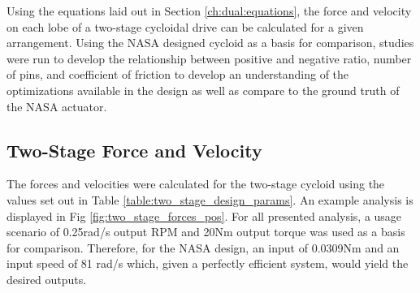 Using the equations laid out in Section \ref{ch:dual:equations}, the force and velocity on each lobe of a two-stage cycloidal drive can be calculated for a given arrangement. Using the NASA designed cycloid as a basis for comparison, studies were run to develop the relationship between positive and negative ratio, number of pins, and coefficient of friction to develop an understanding of the optimizations available in the design as well as compare to the ground truth of the NASA actuator. 

\subsection{Two-Stage Force and Velocity}\label{ch:dual:test_results:force_vel}

The forces and velocities were calculated for the two-stage cycloid using the values set out in Table \ref{table:two_stage_design_params}. An example analysis is displayed in Fig \ref{fig:two_stage_forces_pos}. For all presented analysis, a usage scenario of 0.25rad/s output RPM and 20Nm output torque was used as a basis for comparison. Therefore, for the NASA design, an input of 0.0309Nm and an input speed of 81 rad/s which, given a perfectly efficient system, would yield the desired outputs. 

